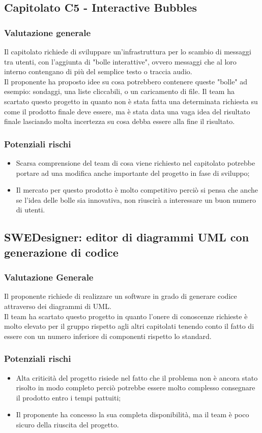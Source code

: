 \documentclass[12pt,a4paper,titlepage]{article}
\begin{document}
\subsection{Capitolato C5 - Interactive Bubbles}
\subsubsection{Valutazione generale}
Il capitolato richiede di sviluppare un'infrastruttura per lo scambio di messaggi tra utenti, con l'aggiunta di "bolle interattive", ovvero messaggi che al loro interno contengano di più del semplice testo o traccia audio.\\
Il proponente ha proposto idee su cosa potrebbero contenere queste "bolle" ad esempio: sondaggi, una liste cliccabili, o un caricamento di file. Il team ha scartato questo progetto in quanto non è stata fatta una determinata richiesta su come il prodotto finale deve essere, ma è stata data una vaga idea del risultato finale lasciando molta incertezza su cosa debba essere alla fine il risultato.
\subsubsection{Potenziali rischi}
\begin{itemize}
	\item Scarsa comprensione del team di cosa viene richiesto nel capitolato potrebbe portare ad una modifica anche importante del progetto in fase di sviluppo;
	\item Il mercato per questo prodotto è molto competitivo perciò si pensa che anche se l'idea delle bolle sia innovativa, non riuscirà a interessare un buon numero di utenti.
\end{itemize}

\subsection{SWEDesigner: editor di diagrammi UML con generazione di codice}
\subsubsection{Valutazione Generale}
Il proponente richiede di realizzare un software in grado di generare codice attraverso dei diagrammi di UML. \\
Il team ha scartato questo progetto in quanto l'onere di conoscenze richieste è molto elevato per il gruppo rispetto agli altri capitolati tenendo conto il fatto di essere con un numero inferiore di componenti rispetto lo standard.
\subsubsection{Potenziali rischi}
\begin{itemize}
	\item Alta criticità del progetto risiede nel fatto che il problema non è ancora stato risolto in modo completo perciò potrebbe essere molto complesso consegnare il prodotto entro i tempi pattuiti;
	\item Il proponente ha concesso la sua completa disponibilità, ma il team è poco sicuro della riuscita del progetto.
\end{itemize}
\end{document}
